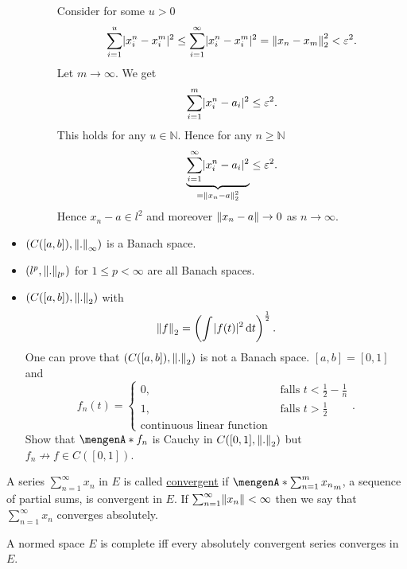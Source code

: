 \begin{beispiele}
\begin{itemize}
\begin{beweis}
\begin{description}
\[				\]
				Consider for some $u>0$
				\begin{align*}
					\sum^{u}_{i=1} \abs{x_i^n-x_i^m}^2 \leq \sum_{i=1}^{\infty}\abs{x_i^n-x_i^m}^2 = \norm{x_n-x_m}^2_2 < \varepsilon^2.
				\end{align*}
				Let $m \to \infty$. We get 
				\[
					\sum^{m}_{i=1} \lvert x_i^n-a_i\rvert^2 \leq  \varepsilon^2.
				\]
				This holds for any $u \in \mathbb{N}$. Hence for any $n \geq \mathbb{N}$
				\[
					\underset{= \norm{x_n-a}_2^2}{\underbrace{\sum_{i=1}^{\infty}\abs{x_i^n-a_i}^2}} \leq \varepsilon^2.
				\]
				Hence $x_n - a \in l^2$ and moreover $\norm{x_n - a} \to 0$ as $n \to \infty$.
			\end{description}
		\end{beweis}
		\item $(C([a,b]),\norm{.}_{\infty})$ is a Banach space.
		\item $(l^p,\norm{.}_{l^p})$ for $1 \leq p < \infty$ are all Banach spaces.
		\item $(C([a,b]),\norm{.}_2)$ with
		\[
			\norm{f}_2 = \left( \int_{}^{} \abs{f(t)}^2 \,\mathrm{d}t \right)^{\frac{1}{2}}.
		\]
		One can prove that $(C([a,b]),\norm{.}_2)$ is not a Banach space.
		 $[a,b] = [0,1]$ and \[
			f_n(t)= \begin{cases}
				0, &\text{ falls }t < \frac{1}{2} - \frac{1}{n}\\
				1, &\text{ falls }t > \frac{1}{2}\\
				\text{continuous linear function}
			\end{cases}.
		\]
		Show that $\set{f_n}$ is Cauchy in $C([0,1],\norm{.}_2)$ but $f_n \not \to f \in C([0,1])$.
	\end{itemize}
\end{beispiele}
\begin{definition*}
	A series $\sum_{n=1}^{\infty}x_n$ in $E$ is called \underline{convergent} if $\set{\sum_{n=1}^{m}x_n}_m$, a sequence of partial sums, is convergent in $E$. If $\sum_{n=1}^{\infty}\norm{x_n} < \infty$ then we say that $\sum_{n=1}^{\infty}x_n$ converges absolutely.
\end{definition*}
\begin{theorem}
	A normed space $E$ is complete iff every absolutely convergent series converges in $E$.
\end{theorem}

